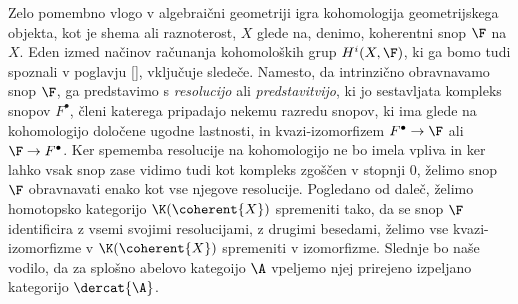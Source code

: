Zelo pomembno vlogo v algebraični geometriji igra kohomologija geometrijskega objekta, kot je shema ali raznoterost, $X$ glede na, denimo, koherentni snop $\F$ na $X$. Eden izmed načinov računanja kohomoloških grup $H^i(X, \F)$, ki ga bomo tudi spoznali v poglavju \ref{}, vključuje sledeče. 
Namesto, da 
intrinzično obravnavamo snop $\F$, ga predstavimo s \ti \emph{resolucijo} ali \emph{predstavitvijo}, ki jo sestavljata kompleks snopov $F^\bullet$, členi katerega pripadajo nekemu razredu snopov, ki ima glede na kohomologijo določene ugodne lastnosti, in kvazi-izomorfizem $F^\bullet \to \F$ ali $\F \to F^\bullet$. Ker spememba resolucije na kohomologijo ne bo imela vpliva in ker lahko vsak snop zase vidimo tudi kot kompleks zgoščen v stopnji $0$, želimo snop $\F$ obravnavati enako kot vse njegove resolucije. 
Pogledano od daleč, želimo homotopsko kategorijo $\K(\coherent{X})$ spremeniti tako, da se snop $\F$ identificira z vsemi svojimi resolucijami, \oz z drugimi besedami, želimo vse kvazi-izomorfizme v $\K(\coherent{X})$ spremeniti v izomorfizme. Slednje bo naše vodilo, da za splošno abelovo kategoijo $\A$ vpeljemo njej prirejeno izpeljano kategorijo $\dercat{\A}$.  



